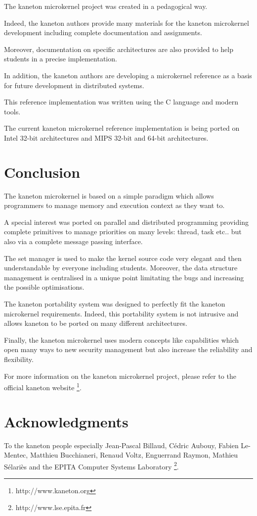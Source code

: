 \begin{multicols}{2}
The kaneton microkernel project was created in a pedagogical way.

Indeed, the kaneton authors provide many materials for the kaneton
microkernel development including complete documentation and assignments.

Moreover, documentation on specific architectures are also provided
to help students in a precise implementation.

In addition, the kaneton authors are developing a microkernel reference
as a basis for future development in distributed systems.

This reference implementation was written using the C language and
modern tools.

The current kaneton microkernel reference implementation is being
ported on Intel 32-bit architectures and MIPS 32-bit and 64-bit architectures.

%
%

\section{Conclusion}

The kaneton microkernel is based on a simple paradigm which allows
programmers to manage memory and execution context as they want to.

A special interest was ported on parallel and distributed programming
providing complete primitives to manage priorities on many levels:
thread, task etc.. but also via a complete message passing interface.

The set manager is used to make the kernel source code very elegant
and then understandable by everyone including students. Moreover, the
data structure management is centralised in a unique point limitating
the bugs and increasing the possible optimisations.

The kaneton portability system was designed to perfectly fit the
kaneton microkernel requirements. Indeed, this portability system
is not intrusive and allows kaneton to be ported on many different
architectures.

Finally, the kaneton microkernel uses modern concepts like
capabilities which open many ways to new security management but
also increase the reliability and flexibility.

For more information on the kaneton microkernel project, please refer
to the official kaneton website
  \footnote{http://www.kaneton.org}.

%
%

\section{Acknowledgments}

To the kaneton people especially Jean-Pascal Billaud, C\'edric Aubouy,
Fabien Le-Mentec, Matthieu Bucchianeri, Renaud Voltz, Enguerrand Raymon,
Mathieu S\'elari\`es and the EPITA Computer Systems Laboratory
  \footnote{http://www.lse.epita.fr}.

\end{multicols}


